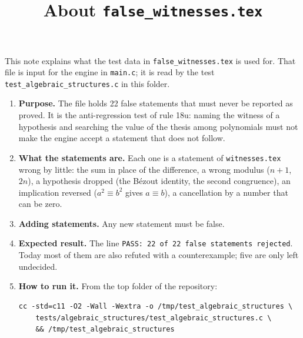 \documentclass[11pt,a4paper]{article}
\title{About \texttt{false\_witnesses.tex}}
\author{}
\date{}
\begin{document}
\maketitle
This note explains what the test data in \texttt{false\_witnesses.tex} is used for. That file is input for the engine in \texttt{main.c}; it is read by the test \texttt{test\_algebraic\_structures.c} in this folder.

\begin{enumerate}
\item \textbf{Purpose.} The file holds 22 false statements that must never be reported as proved. It is the anti-regression test of rule 18u: naming the witness of a hypothesis and searching the value of the thesis among polynomials must not make the engine accept a statement that does not follow.

\item \textbf{What the statements are.} Each one is a statement of \texttt{witnesses.tex} wrong by little: the sum in place of the difference, a wrong modulus ($n + 1$, $2n$), a hypothesis dropped (the B\'ezout identity, the second congruence), an implication reversed ($a^{2} \equiv b^{2}$ gives $a \equiv b$), a cancellation by a number that can be zero.

\item \textbf{Adding statements.} Any new statement must be false.

\item \textbf{Expected result.} The line \texttt{PASS: 22 of 22 false statements rejected}. Today most of them are also refuted with a counterexample; five are only left undecided.

\item \textbf{How to run it.} From the top folder of the repository:
\begin{verbatim}
cc -std=c11 -O2 -Wall -Wextra -o /tmp/test_algebraic_structures \
    tests/algebraic_structures/test_algebraic_structures.c \
    && /tmp/test_algebraic_structures
\end{verbatim}
\end{enumerate}
\end{document}
